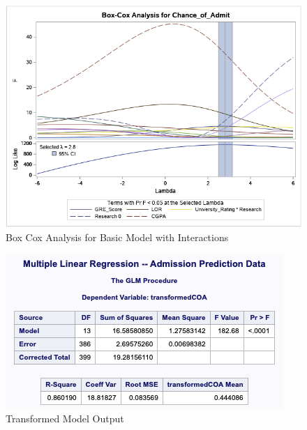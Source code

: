 \documentclass{article}
\begin{document}
\begin{figure}
\centering
\includegraphics[scale=0.5]{box_cox_analysis.png}
\caption{Box Cox Analysis for Basic Model with Interactions}
\label{fig:boxcoxanalysis}
\end{figure}

\begin{figure}
\centering
\includegraphics[scale=1]{transformed_model_output.png}
\caption{Transformed Model Output}
\label{fig:transformedmodeloutput}
\end{figure}
\end{document}
